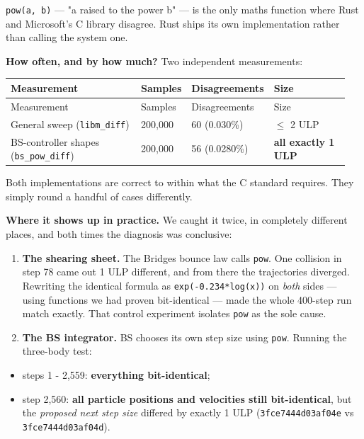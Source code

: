 \documentclass[11pt]{article}
\begin{document}
\texttt{pow(a, b)} --- "a raised to the power b" --- is the only maths function where Rust and Microsoft's C library disagree. Rust ships its own implementation rather than calling the system one.

\textbf{How often, and by how much?} Two independent measurements:

\begin{longtable}{L{0.438\linewidth}L{0.099\linewidth}L{0.158\linewidth}L{0.255\linewidth}}
\toprule
Measurement & Samples & Disagreements & Size \\
\midrule
\endfirsthead
\toprule
Measurement & Samples & Disagreements & Size \\
\midrule
\endhead
General sweep (\texttt{libm\_diff}) & 200,000 & 60 (0.030\%) & \(\leq\) 2 ULP \\
BS-controller shapes (\texttt{bs\_pow\_diff}) & 200,000 & 56 (0.0280\%) & \textbf{all exactly 1 ULP} \\
\bottomrule
\end{longtable}

Both implementations are correct to within what the C standard requires. They simply round a handful of cases differently.

\textbf{Where it shows up in practice.} We caught it twice, in completely different places, and both times the diagnosis was conclusive:

\begin{enumerate}
\item \textbf{The shearing sheet.} The Bridges bounce law calls \texttt{pow}. One collision in step 78 came out 1 ULP different, and from there the trajectories diverged. Rewriting the identical formula as \texttt{exp(-0.234*log(x))} on \emph{both} sides --- using functions we had proven bit-identical --- made the whole 400-step run match exactly. That control experiment isolates \texttt{pow} as the sole cause.
\item \textbf{The BS integrator.} BS chooses its own step size using \texttt{pow}. Running the three-body test:
\end{enumerate}

\begin{itemize}
\item steps 1 - 2,559: \textbf{everything bit-identical};
\item step 2,560: \textbf{all particle positions and velocities still bit-identical}, but the \emph{proposed next step size} differed by exactly 1 ULP (\texttt{3fce7444d03af04e} vs \texttt{3fce7444d03af04d}).
\end{itemize}
\end{document}
